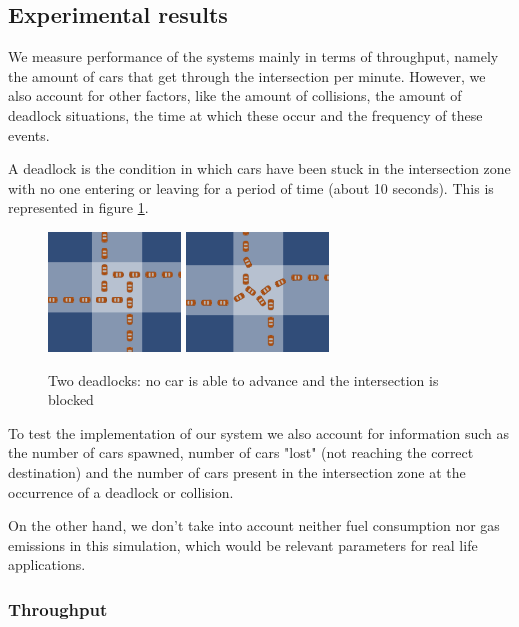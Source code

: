 \subsection{Experimental results}

We measure performance of the systems mainly in terms of throughput, namely the amount of cars that get through the intersection per minute.
However, we also account for other factors, like the amount of collisions, the amount of deadlock situations, the time at which these occur and the frequency of these events.

A deadlock is the condition in which cars have been stuck in the intersection zone with no one entering or leaving for a period of time (about 10 seconds). This is represented in figure \ref{fig:deadlock}.

\begin{figure}
\centering
\includegraphics[height=120px]{img/deadlock2}
\includegraphics[height=120px]{img/deadlock}
\caption{Two deadlocks: no car is able to advance and the intersection is blocked}
\label{fig:deadlock}
\end{figure}

To test the implementation of our system we also account for information such as the number of cars spawned, number of cars "lost" (not reaching the correct destination) and the number of cars present in the intersection zone at the occurrence of a deadlock or collision.


On the other hand, we don't take into account neither fuel consumption nor gas emissions in this simulation, which would be relevant parameters for real life applications.

\subsubsection{Throughput}

